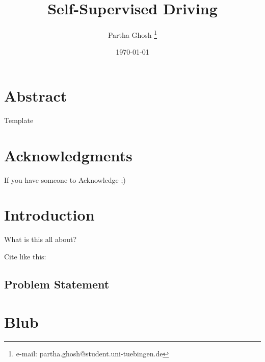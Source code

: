 \documentclass[11pt, a4paper,cleardoubleempty,BCOR1cm]{scrbook}
\title{Self-Supervised Driving}
\author{Partha Ghosh \thanks{e-mail: partha.ghosh@student.uni-tuebingen.de}}
\date{\today}
\begin{document}


\chapter*{Abstract}
Template

\chapter*{Acknowledgments}
If you have someone to Acknowledge ;)

\tableofcontents


\chapter{Introduction}
What is this all about?

Cite like this: \cite{agarwal2011}

\section{Problem Statement}



\appendix
\chapter{Blub}



\end{document}
